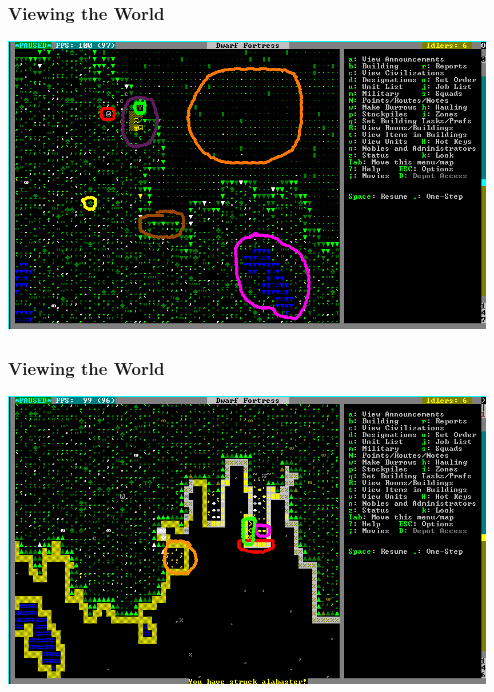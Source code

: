 \begin{frame}[fragile]
\frametitle{Viewing the World}
\includegraphics[height=3in]{img/world1}
\end{frame}

\begin{frame}[fragile]
\frametitle{Viewing the World}
\includegraphics[height=3in]{img/world2}
\end{frame}
